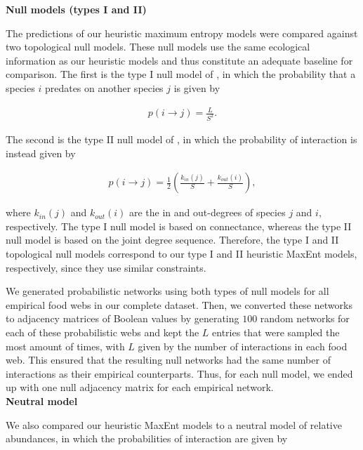 \begin{box3.2}

\textbf{Null models (types I and II)}

The predictions of our heuristic maximum entropy models were compared against
two topological null models. These null models use the same ecological
information as our heuristic models and thus constitute an adequate baseline for
comparison. The first is the type I null model of \cite{Fortuna2006Habitat}, in
which the probability that a species $i$ predates on another species $j$ is
given by
  
\begin{eqnarray}
\label{eq:type1null}
    p(i \rightarrow j) = \frac{L}{S^2}.
\end{eqnarray}
  
The second is the type II null model of \cite{Bascompte2003Nested}, in which
the probability of interaction is instead given by 
  
\begin{eqnarray}
\label{eq:type2null}
    p(i \rightarrow j) = \frac{1}{2} \left(\frac{k_{in}(j)}{S} +
    \frac{k_{out}(i)}{S}\right),
\end{eqnarray}
  
where $k_{in}(j)$ and $k_{out}(i)$ are the in and out-degrees of species $j$ and
$i$, respectively. The type I null model is based on connectance, whereas the
type II null model is based on the joint degree sequence. Therefore, the type I
and II topological null models correspond to our type I and II heuristic MaxEnt
models, respectively, since they use similar constraints. 
  
We generated probabilistic networks using both types of null models for all
empirical food webs in our complete dataset. Then, we converted these networks
to adjacency matrices of Boolean values by generating $100$ random networks for
each of these probabilistic webs and kept the $L$ entries that were sampled the
most amount of times, with $L$ given by the number of interactions in each food
web. This ensured that the resulting null networks had the same number of
interactions as their empirical counterparts. Thus, for each null model, we
ended up with one null adjacency matrix for each empirical network. \\

\textbf{Neutral model}
  
We also compared our heuristic MaxEnt models to a neutral model of relative
abundances, in which the probabilities of interaction are given by
  

\end{box3.2}
